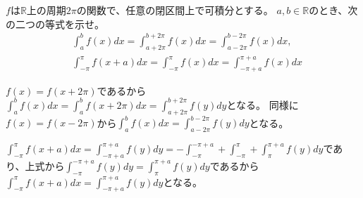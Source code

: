 \begin{renshu}
$f$は$\mathbb{R}$上の周期$2\pi$の関数で、任意の閉区間上で可積分とする。
$a,b\in\mathbb{R}$のとき、次の二つの等式を示せ。
\begin{align}
&\int_{a}^{b}f(x)dx=\int_{a+2\pi}^{b+2\pi}f(x)dx=\int_{a-2\pi}^{b-2\pi}f(x)dx,\\
&\int_{-\pi}^{\pi}f(x+a)dx=\int_{-\pi}^{\pi}f(x)dx=\int_{-\pi+a}^{\pi+a}f(x)dx
\end{align}
\end{renshu}

\begin{kaitou*}
$f(x)=f(x+2\pi)$であるから$\int_{a}^{b}f(x)dx=\int_{a}^{b}f(x+2\pi)dx=\int_{a+2\pi}^{b+2\pi}f(y)dy$となる。
同様に$f(x)=f(x-2\pi)$から$\int_{a}^{b}f(x)dx=\int_{a-2\pi}^{b-2\pi}f(y)dy$となる。

$\int_{-\pi}^{\pi}f(x+a)dx=\int_{-\pi+a}^{\pi+a}f(y)dy=-\int_{-\pi}^{-\pi+a}+\int_{-\pi}^{\pi}+\int_{\pi}^{\pi+a}f(y)dy$であり、上式から$\int_{-\pi}^{-\pi+a}f(y)dy=\int_{\pi}^{\pi+a}f(y)dy$であるから$\int_{-\pi}^{\pi}f(x+a)dx=\int_{-\pi+a}^{\pi+a}f(y)dy$となる。

\end{kaitou*}